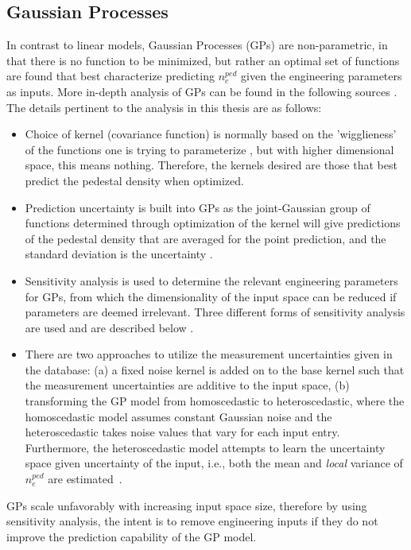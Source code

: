 \documentclass[a4paper, twoside, final, 12pt]{article}
\begin{document}
\subsection{Gaussian Processes}
In contrast to linear models, Gaussian Processes (GPs) are non-parametric, in that there is no function to be minimized, but rather an optimal set of functions are found that best characterize predicting $n_e^{ped}$ given the engineering parameters as inputs.
More in-depth analysis of GPs can be found in the following sources \cite{gortler2019a, Rasmussen2004, vapnik95}.
The details pertinent to the analysis in this thesis are as follows:
\begin{itemize}
	\item Choice of kernel (covariance function) is normally based on the 'wigglieness' of the functions one is trying to parameterize \cite{cov-matrix-maths}, but with higher dimensional space, this means nothing. Therefore, the kernels desired are those that best predict the pedestal density when optimized.
	\item Prediction uncertainty is built into GPs as the joint-Gaussian group of functions determined through optimization of the kernel will give predictions of the pedestal density that are averaged for the point prediction, and the standard deviation is the uncertainty \cite{Rasmussen2004}. 
	\item Sensitivity analysis is used to determine the relevant engineering parameters for GPs, from which the dimensionality of the input space can be reduced if parameters are deemed irrelevant. Three different forms of sensitivity analysis are used and are described below \cite{pmlr-v89-paananen19a}. 
	\item There are two approaches to utilize the measurement uncertainties given in the database: (a) a fixed noise kernel is added on to the base kernel such that the measurement uncertainties are additive to the input space, (b) transforming the GP model from homoscedastic to heteroscedastic, where the homoscedastic model assumes constant Gaussian noise and the heteroscedastic takes noise values that vary for each input entry. Furthermore, the heteroscedastic model attempts to learn the uncertainty space given uncertainty of the input, i.e., both the mean and \textit{local} variance of $n_e^{ped}$ are estimated~\cite{heteroscedastic}.   
\end{itemize}

GPs scale unfavorably with increasing input space size, therefore by using sensitivity analysis, the intent is to remove engineering inputs if they do not improve the prediction capability of the GP model.
\end{document}
